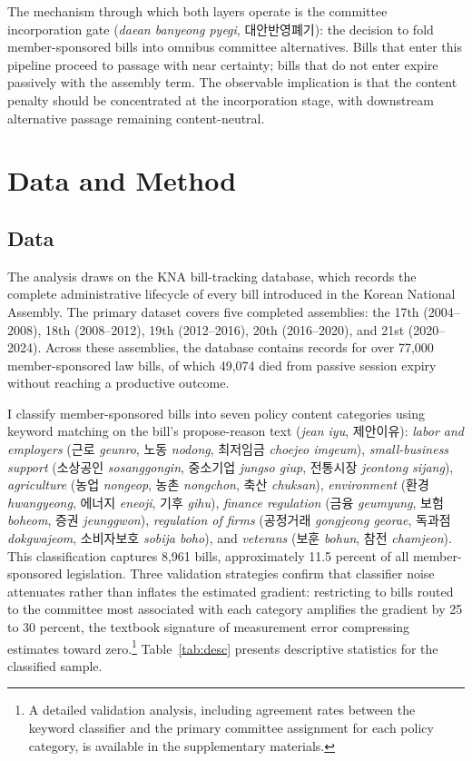 \documentclass[11pt]{article}
\begin{document}
The mechanism through which both layers operate is the committee incorporation gate (\textit{daean banyeong pyegi}, 대안반영폐기): the decision to fold member-sponsored bills into omnibus committee alternatives. Bills that enter this pipeline proceed to passage with near certainty; bills that do not enter expire passively with the assembly term. The observable implication is that the content penalty should be concentrated at the incorporation stage, with downstream alternative passage remaining content-neutral.

\section{Data and Method}
\label{sec:data}

\subsection{Data}

The analysis draws on the KNA bill-tracking database, which records the complete administrative lifecycle of every bill introduced in the Korean National Assembly. The primary dataset covers five completed assemblies: the 17th (2004--2008), 18th (2008--2012), 19th (2012--2016), 20th (2016--2020), and 21st (2020--2024). Across these assemblies, the database contains records for over 77,000 member-sponsored law bills, of which 49,074 died from passive session expiry without reaching a productive outcome.

I classify member-sponsored bills into seven policy content categories using keyword matching on the bill's propose-reason text (\textit{jean iyu}, 제안이유): \textit{labor and employers} (근로 \textit{geunro}, 노동 \textit{nodong}, 최저임금 \textit{choejeo imgeum}), \textit{small-business support} (소상공인 \textit{sosanggongin}, 중소기업 \textit{jungso giup}, 전통시장 \textit{jeontong sijang}), \textit{agriculture} (농업 \textit{nongeop}, 농촌 \textit{nongchon}, 축산 \textit{chuksan}), \textit{environment} (환경 \textit{hwangyeong}, 에너지 \textit{eneoji}, 기후 \textit{gihu}), \textit{finance regulation} (금융 \textit{geumyung}, 보험 \textit{boheom}, 증권 \textit{jeunggwon}), \textit{regulation of firms} (공정거래 \textit{gongjeong georae}, 독과점 \textit{dokgwajeom}, 소비자보호 \textit{sobija boho}), and \textit{veterans} (보훈 \textit{bohun}, 참전 \textit{chamjeon}). This classification captures 8,961 bills, approximately 11.5 percent of all member-sponsored legislation. Three validation strategies confirm that classifier noise attenuates rather than inflates the estimated gradient: restricting to bills routed to the committee most associated with each category amplifies the gradient by 25 to 30 percent, the textbook signature of measurement error compressing estimates toward zero.\footnote{A detailed validation analysis, including agreement rates between the keyword classifier and the primary committee assignment for each policy category, is available in the supplementary materials.} Table~\ref{tab:desc} presents descriptive statistics for the classified sample.
\end{document}
